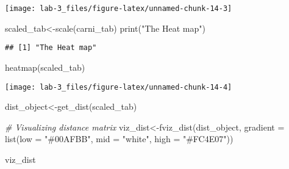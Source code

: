 \documentclass[
]{article}
\newenvironment{Shaded}{\begin{snugshade}}{\end{snugshade}}
\newcommand{\AttributeTok}[1]{\textcolor[rgb]{0.77,0.63,0.00}{#1}}
\newcommand{\CommentTok}[1]{\textcolor[rgb]{0.56,0.35,0.01}{\textit{#1}}}
\newcommand{\FunctionTok}[1]{\textcolor[rgb]{0.00,0.00,0.00}{#1}}
\newcommand{\NormalTok}[1]{#1}
\newcommand{\OtherTok}[1]{\textcolor[rgb]{0.56,0.35,0.01}{#1}}
\newcommand{\SpecialCharTok}[1]{\textcolor[rgb]{0.00,0.00,0.00}{#1}}
\newcommand{\StringTok}[1]{\textcolor[rgb]{0.31,0.60,0.02}{#1}}
\begin{document}
\begin{Shaded}
\end{Shaded}

\begin{center}\texttt{[image: lab-3\_files/figure-latex/unnamed-chunk-14-3]} \end{center}

\begin{Shaded}
\begin{Highlighting}[]
\NormalTok{scaled\_tab}\OtherTok{\textless{}{-}}\FunctionTok{scale}\NormalTok{(carni\_tab)}
\FunctionTok{print}\NormalTok{(}\StringTok{"The Heat map"}\NormalTok{)}
\end{Highlighting}
\end{Shaded}

\begin{verbatim}
## [1] "The Heat map"
\end{verbatim}

\begin{Shaded}
\begin{Highlighting}[]
\FunctionTok{heatmap}\NormalTok{(scaled\_tab)}
\end{Highlighting}
\end{Shaded}

\begin{center}\texttt{[image: lab-3\_files/figure-latex/unnamed-chunk-14-4]} \end{center}

\begin{Shaded}
\begin{Highlighting}[]
\NormalTok{dist\_object}\OtherTok{\textless{}{-}}\FunctionTok{get\_dist}\NormalTok{(scaled\_tab)}

\CommentTok{\# Visualizing distance matrix}
\NormalTok{viz\_dist}\OtherTok{\textless{}{-}}\FunctionTok{fviz\_dist}\NormalTok{(dist\_object, }\AttributeTok{gradient =} \FunctionTok{list}\NormalTok{(}\AttributeTok{low =} \StringTok{"\#00AFBB"}\NormalTok{, }\AttributeTok{mid =} \StringTok{"white"}\NormalTok{, }\AttributeTok{high =} \StringTok{"\#FC4E07"}\NormalTok{))}

\NormalTok{viz\_dist}
\end{Highlighting}
\end{Shaded}
\end{document}
